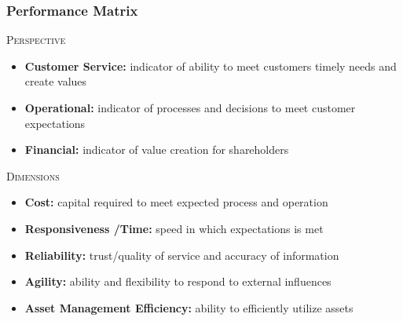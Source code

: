 \documentclass[10pt,handout,notes=show]{beamer}
\begin{document}
\begin{frame}
  \frametitle{Performance Matrix }

  \textsc{Perspective}
  \begin{itemize}
    \item \textbf{Customer Service:} indicator of ability to meet \alert{customers} timely needs and create values
    \item \textbf{Operational:} indicator of \alert{processes} and \alert{decisions} to meet customer expectations
    \item \textbf{Financial:} indicator of value creation for \alert{shareholders}
  \end{itemize}

  \NextHalfLine
  \textsc{Dimensions}
    \begin{itemize}
      \item \textbf{Cost:} \alert{capital} required to meet expected process and operation
      \item \textbf{Responsiveness /Time:} speed in which expectations is met
      \item \textbf{Reliability:} trust/\alert{quality} of service and accuracy of information
      \item \textbf{Agility:}  ability and flexibility to \alert{respond to external} influences
      \item \textbf{Asset Management Efficiency:} ability to efficiently utilize \alert{assets}
    \end{itemize}

\end{frame}
\end{document}
